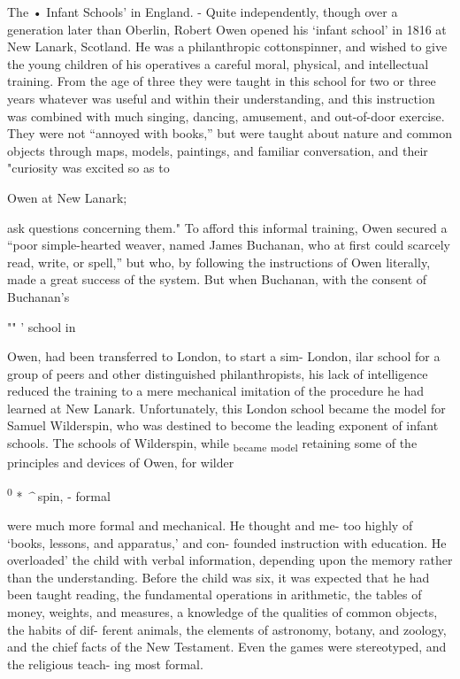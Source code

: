 \documentclass[
]{book}
\begin{document}
The • Infant Schools' in England. - Quite independently, though over a generation later than Oberlin, Robert Owen opened his `infant school' in 1816 at New Lanark, Scotland. He was a philanthropic cottonspinner, and wished to give the young children of his operatives a careful moral, physical, and intellectual training. From the age of three they were taught in this school for two or three years whatever was useful and within their understanding, and this instruction was combined with much singing, dancing, amusement, and out-of-door exercise. They were not ``annoyed with books,'' but were taught about nature and common objects through maps, models, paintings, and familiar conversation, and their "curiosity was excited so as to

Owen at New Lanark;

ask questions concerning them." To afford this informal training, Owen secured a ``poor simple-hearted weaver, named James Buchanan, who at first could scarcely read, write, or spell,'' but who, by following the instructions of Owen literally, made a great success of the system. But when Buchanan, with the consent of Buchanan's

"" ' school in

Owen, had been transferred to London, to start a sim- London, ilar school for a group of peers and other distinguished philanthropists, his lack of intelligence reduced the training to a mere mechanical imitation of the procedure he had learned at New Lanark. Unfortunately, this London school became the model for Samuel Wilderspin, who was destined to become the leading exponent of infant schools. The schools of Wilderspin, while \textsubscript{became} \textsubscript{model} retaining some of the principles and devices of Owen, for wilder

\textsuperscript{0} * \emph{\^{}} spin, - formal

were much more formal and mechanical. He thought and me- too highly of `books, lessons, and apparatus,' and con- founded instruction with education. He overloaded' the child with verbal information, depending upon the memory rather than the understanding. Before the child was six, it was expected that he had been taught reading, the fundamental operations in arithmetic, the tables of money, weights, and measures, a knowledge of the qualities of common objects, the habits of dif- ferent animals, the elements of astronomy, botany, and zoology, and the chief facts of the New Testament. Even the games were stereotyped, and the religious teach- ing most formal.
\end{document}
